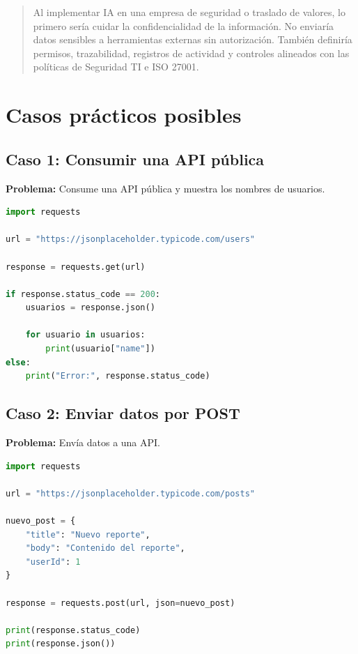 \documentclass[12pt]{article}
\begin{document}
\begin{quote}
Al implementar IA en una empresa de seguridad o traslado de valores, lo primero sería cuidar la confidencialidad de la información. No enviaría datos sensibles a herramientas externas sin autorización. También definiría permisos, trazabilidad, registros de actividad y controles alineados con las políticas de Seguridad TI e ISO 27001.
\end{quote}

\section{Casos prácticos posibles}

\subsection{Caso 1: Consumir una API pública}

\textbf{Problema:} Consume una API pública y muestra los nombres de usuarios.

\begin{lstlisting}[language=Python]
import requests

url = "https://jsonplaceholder.typicode.com/users"

response = requests.get(url)

if response.status_code == 200:
    usuarios = response.json()

    for usuario in usuarios:
        print(usuario["name"])
else:
    print("Error:", response.status_code)
\end{lstlisting}

\subsection{Caso 2: Enviar datos por POST}

\textbf{Problema:} Envía datos a una API.

\begin{lstlisting}[language=Python]
import requests

url = "https://jsonplaceholder.typicode.com/posts"

nuevo_post = {
    "title": "Nuevo reporte",
    "body": "Contenido del reporte",
    "userId": 1
}

response = requests.post(url, json=nuevo_post)

print(response.status_code)
print(response.json())
\end{lstlisting}
\end{document}
